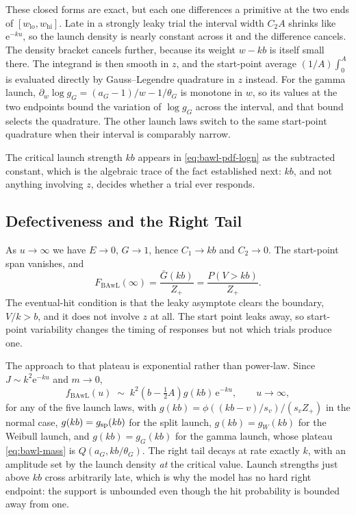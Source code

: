 \documentclass[12pt]{article}
\newcommand{\phiN}{\phi}
\newcommand{\Gbar}{\bar{G}}
\newcommand{\e}{\mathrm{e}}
\theoremstyle{remark}
\begin{document}
These closed forms are exact, but each one differences a primitive at the two ends of $[w_{\mathrm{lo}},w_{\mathrm{hi}}]$. Late in a strongly leaky trial the interval width $C_2A$ shrinks like $\e^{-ku}$, so the launch density is nearly constant across it and the difference cancels. The density bracket cancels further, because its weight $w-kb$ is itself small there. The integrand is then smooth in $z$, and the start-point average $(1/A)\int_0^A$ is evaluated directly by Gauss--Legendre quadrature in $z$ instead. For the gamma launch, $\partial_w\log g_G=(a_G-1)/w-1/\theta_G$ is monotone in $w$, so its values at the two endpoints bound the variation of $\log g_G$ across the interval, and that bound selects the quadrature. The other launch laws switch to the same start-point quadrature when their interval is comparably narrow.

The critical launch strength $kb$ appears in \eqref{eq:bawl-pdf-logn} as the subtracted constant, which is the algebraic trace of the fact established next: $kb$, and not anything involving $z$, decides whether a trial ever responds.

\subsection{Defectiveness and the Right Tail}
As $u \to \infty$ we have $E \to 0$, $G \to 1$, hence $C_1 \to kb$ and $C_2 \to 0$. The start-point span vanishes, and
\begin{equation}
  F_{\mathrm{BAwL}}(\infty) = \frac{\Gbar(kb)}{Z_+} = \frac{P(V > kb)}{Z_+}.
  \label{eq:bawl-mass}
\end{equation}
The eventual-hit condition is that the leaky asymptote clears the boundary, $V/k > b$, and it does not involve $z$ at all. The start point leaks away, so start-point variability changes the timing of responses but not which trials produce one.

The approach to that plateau is exponential rather than power-law. Since $J \sim k^2\e^{-ku}$ and $m \to 0$,
\begin{equation}
  f_{\mathrm{BAwL}}(u) \;\sim\;
  k^2\left(b - \tfrac{1}{2}A\right) g(kb)\,\e^{-ku},
  \qquad u \to \infty,
  \label{eq:bawl-tail}
\end{equation}
for any of the five launch laws, with $g(kb) = \phiN((kb-v)/s_v)/(s_v Z_+)$ in the normal case, $g(kb)=g_{\rm sp}(kb)$ for the split launch, $g(kb)=g_W(kb)$ for the Weibull launch, and $g(kb)=g_G(kb)$ for the gamma launch, whose plateau \eqref{eq:bawl-mass} is $Q(a_G,kb/\theta_G)$. The right tail decays at rate exactly $k$, with an amplitude set by the launch density \emph{at} the critical value. Launch strengths just above $kb$ cross arbitrarily late, which is why the model has no hard right endpoint: the support is unbounded even though the hit probability is bounded away from one.
\end{document}
